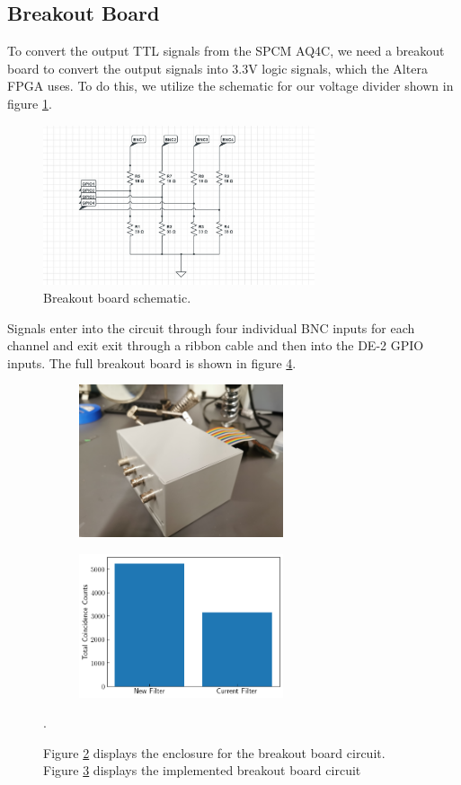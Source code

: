 \documentclass[letterpaper, 11 pt]{article}
\begin{document}
\subsection{Breakout Board}

To convert the output TTL signals from the SPCM AQ4C, we need a breakout board to convert
the output signals into 3.3V logic signals, which the Altera FPGA uses. To do this, we utilize
the schematic for our voltage divider shown in figure \ref{fig:divide}.
\begin{figure}[H]
    \centering
    \includegraphics[width = 8cm]{BB_schematic.jpg}
    \caption{Breakout board schematic.}
    \label{fig:divide}
\end{figure}
Signals enter into the circuit through four individual BNC inputs for each channel and exit
exit through a ribbon cable and then into the DE-2
GPIO inputs. The full breakout board is shown in figure \ref{fig:bb}.
\begin{figure}[H]%
    \centering
    \begin{subfigure}{.4\textwidth}
    \includegraphics[width=6cm]{BB_box.jpg}
    \caption{ }
    \label{fig:box}
    \end{subfigure}
    \begin{subfigure}{.4\textwidth}
    \includegraphics[width = 6cm]{filter_cc_irled.png}
    \caption{ }
    \label{fig:circ}
    \end{subfigure}
    \caption{Figure \ref{fig:box} displays the enclosure for the breakout board circuit.
    Figure \ref{fig:circ} displays the implemented breakout board circuit}.
    \label{fig:bb}
\end{figure}
\end{document}
